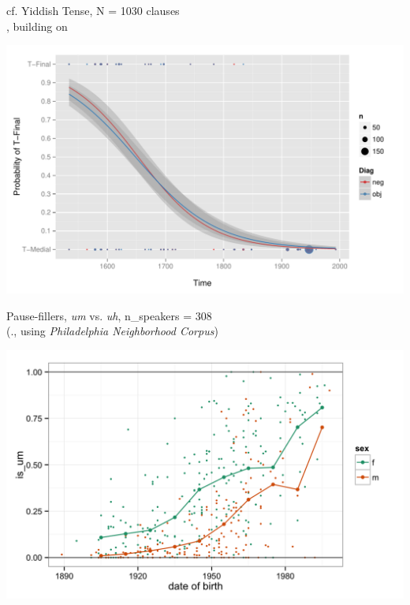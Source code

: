 \documentclass[hyperref={pdfpagelabels=false}]{beamer}
\begin{document}
\begin{frame}{cf. Yiddish Tense, N = 1030 clauses \\ \small{\citet{wallenberg2013}, building on \citet{santorini1993a}}}

\begin{center}
\includegraphics[width=1.05\textwidth]{yiddishLogistic.pdf}
\end{center}
\end{frame}

\begin{frame}{Pause-fillers, \textsl{um} vs. \textsl{uh},  \small{n_{speakers} = 308}\\\small{(\citealt{fruehwald2015}., using \textsl{Philadelphia Neighborhood Corpus})} %
		}
		
		\includegraphics[width=1.16\textwidth]{um.png}
	
	
\end{frame}
\end{document}
